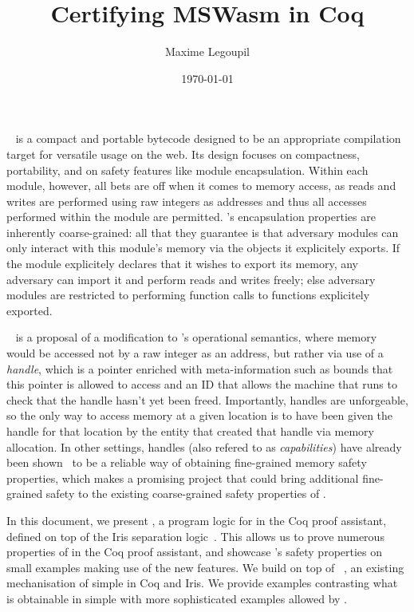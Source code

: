 \documentclass[acmsmall,screen]{acmart}\settopmatter{}
\author{Maxime Legoupil}
\title{Certifying MSWasm in Coq}
\date{\today}
\begin{document}
\maketitle

\wasm~\cite{wasm} is a compact and portable bytecode designed to be an appropriate compilation target for versatile usage on the web. Its design focuses on compactness, portability, and on safety features like module encapsulation. Within each \wasm module, however, all bets are off when it comes to memory access, as reads and writes are performed using raw \xxWithirtytwo integers as addresses and thus all accesses performed within the module are permitted. \wasm's encapsulation properties are inherently coarse-grained: all that they guarantee is that adversary modules can only interact with this module's memory via the objects it explicitely exports. If the module explicitely declares that it wishes to export its memory, any adversary can import it and perform reads and writes freely; else adversary modules are restricted to performing function calls to functions explicitely exported.

\mswasm~\cite{mswasm} is a proposal of a modification to \wasm's operational semantics, where memory would be accessed not by a raw \xxWithirtytwo integer as an address, but rather via use of a \emph{handle}, which is a pointer enriched with meta-information such as bounds that this pointer is allowed to access and an ID that allows the machine that runs \mswasm to check that the handle hasn't yet been freed. Importantly, handles are unforgeable, so the only way to access memory at a given location is to have been given the handle for that location by the entity that created that handle via memory allocation. In other settings, handles (also refered to as \emph{capabilities}) have already been shown~\cite{capabilities} to be a reliable way of obtaining fine-grained memory safety properties, which makes \mswasm a promising project that could bring additional fine-grained safety to the existing coarse-grained safety properties of \wasm.

In this document, we present \irismswasm, a program logic for \mswasm in the Coq proof assistant, defined on top of the Iris separation logic~\cite{iris}. This allows us to prove numerous properties of \mswasm in the Coq proof assistant, and showcase \mswasm's safety properties on small examples making use of the new features. We build \irismswasm on top of \iriswasm~\cite{iriswasm}, an existing mechanisation of simple \wasm in Coq and Iris. We provide examples contrasting what is obtainable in simple \wasm with more sophisticated examples allowed by \mswasm.
\end{document}
